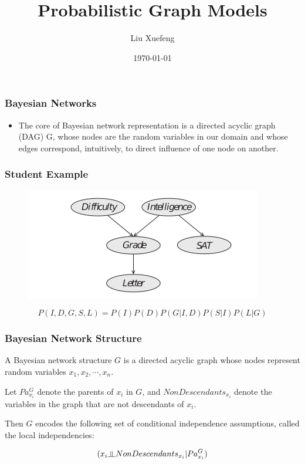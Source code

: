 \documentclass[11pt]{beamer}
\newcommand{\indep}{\rotatebox[origin=c]{90}{$\models$}}
\begin{document}
	\author{Liu Xuefeng}
	\title{Probabilistic Graph Models}
	\date{\today}
	\begin{frame}[plain]
	\maketitle
\end{frame}

\begin{frame}
\frametitle{Bayesian Networks}
	\begin{itemize}
		\item The core of Bayesian network representation is a directed acyclic graph (DAG) G, whose
		nodes are the random variables in our domain and whose edges correspond, intuitively, to direct
		influence of one node on another.
	\end{itemize}
\end{frame}

\begin{frame}
\frametitle{Student Example}
\begin{figure}
	\centering
	\includegraphics[width=0.7\linewidth]{pic/student}
	\label{fig:student}
\end{figure}
\[
P(I, D, G, S, L)=P(I)P(D)P(G|I, D)P(S|I)P(L|G)
\]
\end{frame}

\begin{frame}
\frametitle{Bayesian Network Structure}
A Bayesian network structure $G$ is a directed acyclic graph whose nodes represent random variables $x_1, x_2, \cdots, x_n$. 

Let $Pa_{x_i}^G$ denote the parents of $x_i$ in $G$, and $NonDescendants_{x_i}$ denote the variables in the graph that are not descendants of $x_i$. 

Then $G$ encodes the following set of conditional independence assumptions, called the local independencies:

\[
	(x_i \indep NonDescendants_{x_i} | Pa_{x_i}^G)
\]

\end{frame}
\end{document}

